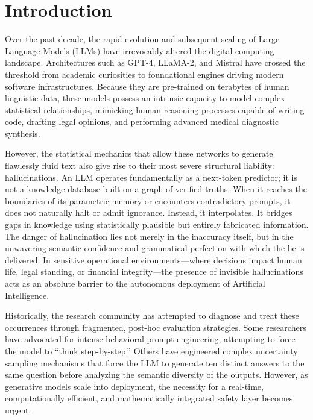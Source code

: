\documentclass{article}
\begin{document}
\section{Introduction}
\label{sec:introduction}

Over the past decade, the rapid evolution and subsequent scaling of Large Language Models (LLMs) have irrevocably altered the digital computing landscape. Architectures such as GPT-4, LLaMA-2, and Mistral have crossed the threshold from academic curiosities to foundational engines driving modern software infrastructures. Because they are pre-trained on terabytes of human linguistic data, these models possess an intrinsic capacity to model complex statistical relationships, mimicking human reasoning processes capable of writing code, drafting legal opinions, and performing advanced medical diagnostic synthesis.

However, the statistical mechanics that allow these networks to generate flawlessly fluid text also give rise to their most severe structural liability: hallucinations. An LLM operates fundamentally as a next-token predictor; it is not a knowledge database built on a graph of verified truths. When it reaches the boundaries of its parametric memory or encounters contradictory prompts, it does not naturally halt or admit ignorance. Instead, it interpolates. It bridges gaps in knowledge using statistically plausible but entirely fabricated information. The danger of hallucination lies not merely in the inaccuracy itself, but in the unwavering semantic confidence and grammatical perfection with which the lie is delivered. In sensitive operational environments—where decisions impact human life, legal standing, or financial integrity—the presence of invisible hallucinations acts as an absolute barrier to the autonomous deployment of Artificial Intelligence.

Historically, the research community has attempted to diagnose and treat these occurrences through fragmented, post-hoc evaluation strategies. Some researchers have advocated for intense behavioral prompt-engineering, attempting to force the model to ``think step-by-step.'' Others have engineered complex uncertainty sampling mechanisms that force the LLM to generate ten distinct answers to the same question before analyzing the semantic diversity of the outputs. However, as generative models scale into deployment, the necessity for a real-time, computationally efficient, and mathematically integrated safety layer becomes urgent.
\end{document}
